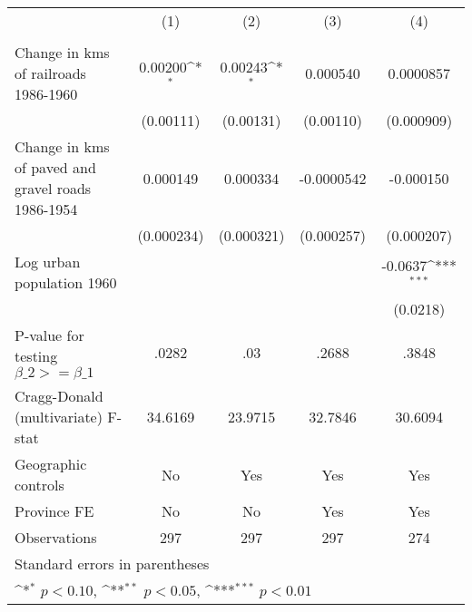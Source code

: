 {
\def\sym#1{\ifmmode^{#1}\else\(^{#1}\)\fi}
\begin{tabular}{l*{4}{c}}
\hline\hline
                &\multicolumn{1}{c}{(1)}&\multicolumn{1}{c}{(2)}&\multicolumn{1}{c}{(3)}&\multicolumn{1}{c}{(4)}\\
                &\multicolumn{1}{c}{}&\multicolumn{1}{c}{}&\multicolumn{1}{c}{}&\multicolumn{1}{c}{}\\
\hline
Change in kms of railroads 1986-1960&  0.00200\sym{*}  &  0.00243\sym{*}  & 0.000540         &0.0000857         \\
                &(0.00111)         &(0.00131)         &(0.00110)         &(0.000909)         \\
[1em]
Change in kms of paved and gravel roads 1986-1954& 0.000149         & 0.000334         &-0.0000542         &-0.000150         \\
                &(0.000234)         &(0.000321)         &(0.000257)         &(0.000207)         \\
[1em]
Log urban population 1960&                  &                  &                  &  -0.0637\sym{***}\\
                &                  &                  &                  & (0.0218)         \\
\hline
P-value for testing $\beta\_{2} >= \beta\_{1}$&    .0282         &      .03         &    .2688         &    .3848         \\
Cragg-Donald (multivariate) F-stat&  34.6169         &  23.9715         &  32.7846         &  30.6094         \\
Geographic controls&       No         &      Yes         &      Yes         &      Yes         \\
Province FE     &       No         &       No         &      Yes         &      Yes         \\
Observations    &      297         &      297         &      297         &      274         \\
\hline\hline
\multicolumn{5}{l}{\footnotesize Standard errors in parentheses}\\
\multicolumn{5}{l}{\footnotesize \sym{*} \(p<0.10\), \sym{**} \(p<0.05\), \sym{***} \(p<0.01\)}\\
\end{tabular}
}
